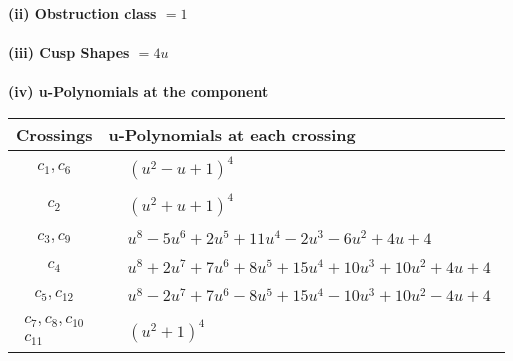 \documentclass[1p]{elsarticle_modified}
\theoremstyle{definition}
\begin{document}
\flushleft \textbf{(ii) Obstruction class $= 1$}\\~\\
\flushleft \textbf{(iii) Cusp Shapes $= 4 u$}\\~\\
\newpage\renewcommand{\arraystretch}{1}
\flushleft \textbf{(iv) u-Polynomials at the component}\newline \\
\begin{tabular}{m{50pt}|m{274pt}}
Crossings & \hspace{64pt}u-Polynomials at each crossing \\
\hline $$\begin{aligned}c_{1},c_{6}\end{aligned}$$&$\begin{aligned}
&(u^2- u+1)^4
\end{aligned}$\\
\hline $$\begin{aligned}c_{2}\end{aligned}$$&$\begin{aligned}
&(u^2+u+1)^4
\end{aligned}$\\
\hline $$\begin{aligned}c_{3},c_{9}\end{aligned}$$&$\begin{aligned}
&u^8-5 u^6+2 u^5+11 u^4-2 u^3-6 u^2+4 u+4
\end{aligned}$\\
\hline $$\begin{aligned}c_{4}\end{aligned}$$&$\begin{aligned}
&u^8+2 u^7+7 u^6+8 u^5+15 u^4+10 u^3+10 u^2+4 u+4
\end{aligned}$\\
\hline $$\begin{aligned}c_{5},c_{12}\end{aligned}$$&$\begin{aligned}
&u^8-2 u^7+7 u^6-8 u^5+15 u^4-10 u^3+10 u^2-4 u+4
\end{aligned}$\\
\hline $$\begin{aligned}c_{7},c_{8},c_{10}\\c_{11}\end{aligned}$$&$\begin{aligned}
&(u^2+1)^4
\end{aligned}$\\
\hline
\end{tabular}\\~\\
\end{document}

